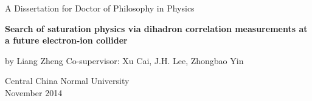 \mbox{}\vskip 0.8cm
\begin{center}
{\Large A Dissertation for Doctor of Philosophy in Physics}
\end{center}
\vspace{0.22in}
\begin{center} {\LARGE \textbf{Search of saturation physics via dihadron correlation measurements at a future electron-ion collider}}
\end{center}
\vspace{0.22in}

\begin{center}
{\Large by Liang Zheng} {\Large \vskip 0.22in  \vskip 0.4in
Co-supervisor: Xu Cai, J.H. Lee, Zhongbao Yin}
\end{center}
\vskip 1.55in

\begin{center}
{\Large  Central \hskip 0.2cm China \hskip 0.2cm Normal \hskip 0.2cm University \\
\vskip 0.5cm November \hskip 0.2cm 2014 }
\end{center}

\clearpage
